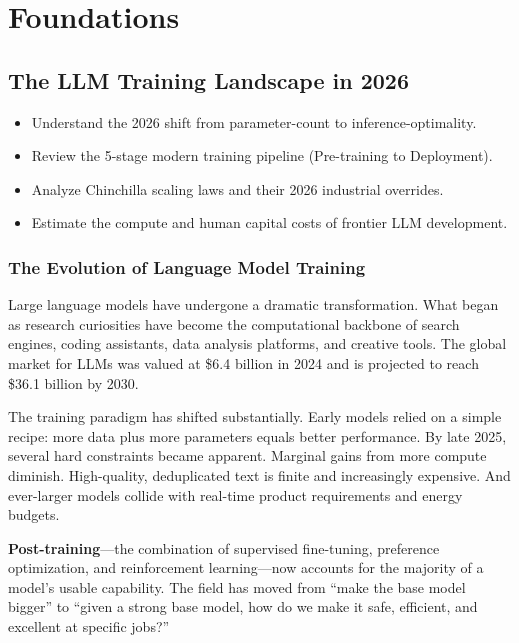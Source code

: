 \part{Foundations}

\chapter{The LLM Training Landscape in 2026}
\minitoc

\begin{chapteroverview}
  \begin{itemize}
    \item Understand the 2026 shift from parameter-count to inference-optimality.
    \item Review the 5-stage modern training pipeline (Pre-training to Deployment).
    \item Analyze Chinchilla scaling laws and their 2026 industrial overrides.
    \item Estimate the compute and human capital costs of frontier LLM development.
  \end{itemize}
\end{chapteroverview}

\section{The Evolution of Language Model Training}

Large language models have undergone a dramatic transformation. What began as research curiosities have become the computational backbone of search engines, coding assistants, data analysis platforms, and creative tools. The global market for LLMs was valued at \$6.4 billion in 2024 and is projected to reach \$36.1 billion by 2030.

The training paradigm has shifted substantially. Early models relied on a simple recipe: more data plus more parameters equals better performance. By late 2025, several hard constraints became apparent. Marginal gains from more compute diminish. High-quality, deduplicated text is finite and increasingly expensive. And ever-larger models collide with real-time product requirements and energy budgets.

\textbf{Post-training}---the combination of supervised fine-tuning, preference optimization, and reinforcement learning---now accounts for the majority of a model's usable capability. The field has moved from ``make the base model bigger'' to ``given a strong base model, how do we make it safe, efficient, and excellent at specific jobs?''


